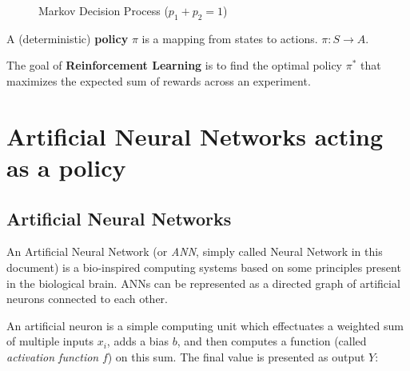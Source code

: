 \begin{figure}[H]
    \centering
  
    \caption{Markov Decision Process ($p_1 + p_2 = 1$)}
    \label{fig:my_label}
\end{figure}

A (deterministic) \textbf{policy} $\pi$ is a mapping from states to actions. $\pi: S \longrightarrow A$.

The goal of \textbf{Reinforcement Learning} is to find the optimal policy $\pi^*$ that maximizes the expected sum of rewards across an experiment. 

\section{Artificial Neural Networks acting as a policy}

\subsection{Artificial Neural Networks}

An Artificial Neural Network (or \textit{ANN}, simply called Neural Network in this document) is a bio-inspired computing systems based on some principles present in the biological brain. ANNs can be represented as a directed graph of artificial neurons connected to each other. 

An artificial neuron is a simple computing unit which effectuates a weighted sum of multiple inputs $x_i$, adds a bias $b$, and then computes a function (called \textit{activation function} $f$) on this sum. The final value is presented as output $Y$:

